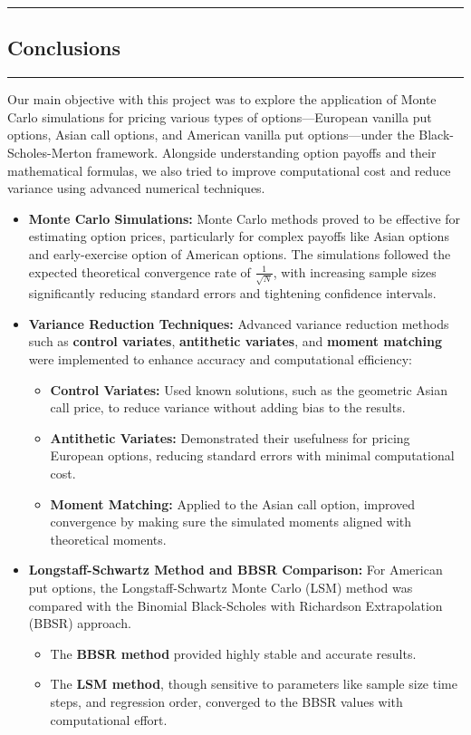 {\color{gray}\hrule}
\begin{center}
\section{Conclusions}
\bigskip
\end{center}
{\color{gray}\hrule}
\vspace{0.5cm}
Our main objective with this project was to explore the application of Monte Carlo simulations for pricing various types of options—European vanilla put options, Asian call options, and American vanilla put options—under the Black-Scholes-Merton framework. Alongside understanding option payoffs and their mathematical formulas, we also tried to improve computational cost and reduce variance using advanced numerical techniques.

\begin{itemize}
    \item \textbf{Monte Carlo Simulations:}  
    Monte Carlo methods proved to be effective for estimating option prices, particularly for complex payoffs like Asian options and early-exercise option of American options. The simulations followed the expected theoretical convergence rate of \( \frac{1}{\sqrt{N}} \), with increasing sample sizes significantly reducing standard errors and tightening confidence intervals.

    \item \textbf{Variance Reduction Techniques:}  
    Advanced variance reduction methods such as \textbf{control variates}, \textbf{antithetic variates}, and \textbf{moment matching} were implemented to enhance accuracy and computational efficiency:
    \begin{itemize}
        \item \textbf{Control Variates:} Used known solutions, such as the geometric Asian call price, to reduce variance without adding bias to the results.
        \item \textbf{Antithetic Variates:} Demonstrated their usefulness for pricing European options, reducing standard errors with minimal computational cost.
        \item \textbf{Moment Matching:} Applied to the Asian call option, improved convergence by making sure the simulated moments aligned with theoretical moments.
    \end{itemize}

    \item \textbf{Longstaff-Schwartz Method and BBSR Comparison:}  
    For American put options, the Longstaff-Schwartz Monte Carlo (LSM) method was compared with the Binomial Black-Scholes with Richardson Extrapolation (BBSR) approach.
    \begin{itemize}
        \item The \textbf{BBSR method} provided highly stable and accurate results.
        \item The \textbf{LSM method}, though sensitive to parameters like sample size time steps, and regression order, converged to the BBSR values with computational effort.
    \end{itemize}

\end{itemize}

